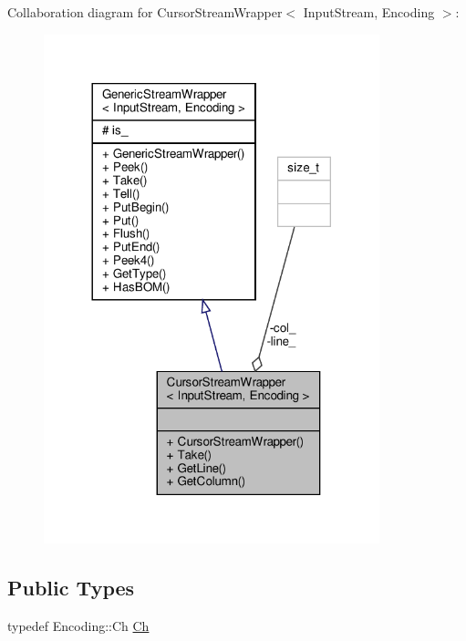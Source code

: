 Collaboration diagram for Cursor\+Stream\+Wrapper$<$ Input\+Stream, Encoding $>$\+:
\nopagebreak
\begin{figure}[H]
\begin{center}
\leavevmode
\includegraphics[width=276pt]{classCursorStreamWrapper__coll__graph}
\end{center}
\end{figure}
\subsection*{Public Types}
\begin{DoxyCompactItemize}
\item 
typedef Encoding\+::\+Ch \hyperlink{classCursorStreamWrapper_a4bab1186bfeebbcf00719c2613b0dca6}{Ch}
\end{DoxyCompactItemize}
